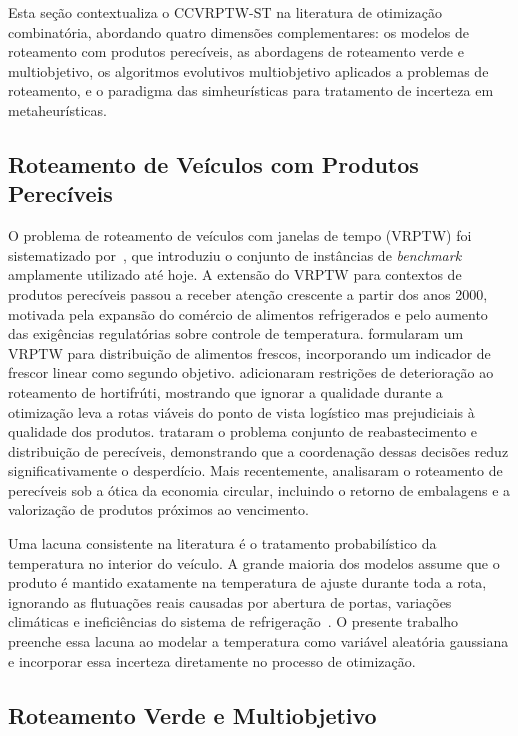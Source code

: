 \documentclass[a4paper,11pt]{article}
\begin{document}
Esta seção contextualiza o CCVRPTW-ST na literatura de otimização combinatória, abordando quatro dimensões complementares: os modelos de roteamento com produtos perecíveis, as abordagens de roteamento verde e multiobjetivo, os algoritmos evolutivos multiobjetivo aplicados a problemas de roteamento, e o paradigma das simheurísticas para tratamento de incerteza em metaheurísticas.

\subsection{Roteamento de Veículos com Produtos Perecíveis}

O problema de roteamento de veículos com janelas de tempo (VRPTW) foi
sistematizado por~\citet{solomon:1987}, que introduziu o conjunto de
inst\^ancias de \textit{benchmark} amplamente utilizado até hoje.
A extensão do VRPTW para contextos de produtos perecíveis passou a receber
atenção crescente a partir dos anos 2000, motivada pela expansão do
comércio de alimentos refrigerados e pelo aumento das exig\^encias
regulatórias sobre controle de temperatura.
\citet{hsu:2007} formularam um VRPTW para distribuição de alimentos
frescos, incorporando um indicador de frescor linear como segundo objetivo.
\citet{osvald:2008} adicionaram restrições de deterioração ao roteamento
de hortifrúti, mostrando que ignorar a qualidade durante a otimização
leva a rotas viáveis do ponto de vista logístico mas prejudiciais à
qualidade dos produtos.
\citet{coelho:2014} trataram o problema conjunto de reabastecimento e
distribuição de perecíveis, demonstrando que a coordenação dessas
decisões reduz significativamente o desperdício.
Mais recentemente, \citet{ramos:2020} analisaram o roteamento de perecíveis
sob a ótica da economia circular, incluindo o retorno de embalagens e a
valorização de produtos próximos ao vencimento.

Uma lacuna consistente na literatura é o tratamento probabilístico da
temperatura no interior do veículo.
A grande maioria dos modelos assume que o produto é mantido exatamente
na temperatura de ajuste durante toda a rota, ignorando as flutuações
reais causadas por abertura de portas, variações climáticas e
inefici\^encias do sistema de refrigeração~\citep{taoukis:1997}.
O presente trabalho preenche essa lacuna ao modelar a temperatura como
variável aleatória gaussiana e incorporar essa incerteza diretamente
no processo de otimização.

\subsection{Roteamento Verde e Multiobjetivo}
\end{document}
